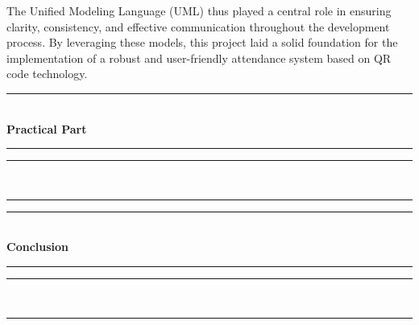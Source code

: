 \documentclass[12pt,a4paper]{report}
\begin{document}
The Unified Modeling Language (UML) thus played a central role in ensuring clarity, consistency, and effective communication throughout the development process. By leveraging these models, this project laid a solid foundation for the implementation of a robust and user-friendly attendance system based on QR code technology.


\newpage
\thispagestyle{empty}

\setcounter{chapter}{2} %

{}

\vspace*{\fill}
\begin{center}
    {\color{mintgreen} \rule{\textwidth}{2pt} }\\[0.5cm]
    {\Huge \textbf{Practical Part}}\\[0.5cm]
    {\color{mintgreen} \rule{0.8\textwidth}{1.5pt} }
\end{center}
\vspace*{\fill}

\begin{center}
    {\color{mintgreen} \rule{0.8\textwidth}{1.5pt} }\\[0.3cm]
    {\color{mintgreen} \rule{\textwidth}{2pt} }
\end{center}









\newpage
\thispagestyle{empty}

\setcounter{chapter}{3}

{}

\vspace*{\fill}
\begin{center}
    {\color{mintgreen} \rule{\textwidth}{2pt} }\\[0.5cm]
    {\Huge \textbf{Conclusion}}\\[0.5cm]
    {\color{mintgreen} \rule{0.8\textwidth}{1.5pt} }
\end{center}
\vspace*{\fill}
\begin{center}
    {\color{mintgreen} \rule{0.8\textwidth}{1.5pt} }\\[0.3cm]
    {\color{mintgreen} \rule{\textwidth}{2pt} }
\end{center}
\vspace{0.3cm}
\end{document}
